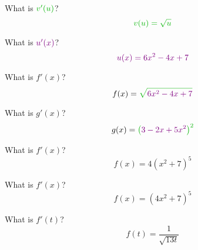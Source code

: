 
\begin{ProblemSet}[pencil space=2in]

 \begin{Problem}[pencil space=1in]
  What is $\OuterStyle{v'(u)}$?
  \begin{equation*}
   \OuterStyle{v(u) = \sqrt{u}}
  \end{equation*}
 \end{Problem}

 \begin{Problem}[pencil space=1in]
  What is $\InnerStyle{u'(x)}$?
  \begin{equation*}
   \InnerStyle{u(x) = 6 x^2 - 4x + 7}
  \end{equation*}
 \end{Problem}

 \begin{Problem}[pencil space=3in]
  What is $f'(x)$?
  \begin{equation*}
   f(x) = \OuterStyle{\sqrt{\InnerStyle{6 x^2 - 4x + 7}}}
  \end{equation*}
 \end{Problem}

  \begin{Problem}
  What is $g'(x)$?
  \begin{equation*}
   g(x) = \OuterStyle{\big(\InnerStyle{3 - 2x + 5x^2}\big)^2}
  \end{equation*}
 \end{Problem}

 \begin{Problem}
  What is $f'(x)$?
  \begin{equation*}
   f(x) = 4 \left(x^2 + 7\right)^5
  \end{equation*}
 \end{Problem}

 \begin{Problem}
  What is $f'(x)$?
  \begin{equation*}
   f(x) = \left(4 x^2 + 7\right)^5
  \end{equation*}
 \end{Problem}

 \begin{Problem}
  What is $f'(t)$?
  \begin{equation*}
   f(t) = \frac{1}{\sqrt{13 t}}
  \end{equation*}
 \end{Problem}


\end{ProblemSet}
